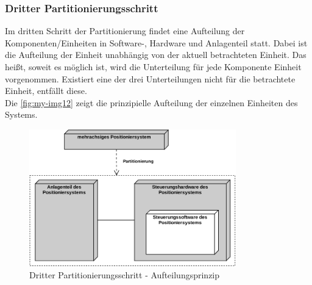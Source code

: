 \documentclass[../Bachelorarbeit.tex]{subfiles}
\begin{document}
\subsubsection{Dritter Partitionierungsschritt}
Im dritten Schritt der Partitionierung findet eine Aufteilung der Komponenten/Einheiten in Software-, Hardware und Anlagenteil statt. Dabei ist die Aufteilung der Einheit unabhängig von der aktuell betrachteten Einheit. Das heißt, soweit es möglich ist, wird die Unterteilung für jede Komponente \bzw Einheit vorgenommen. Existiert eine der drei Unterteilungen nicht für die betrachtete Einheit, entfällt diese.\\
Die \autoref{fig:my-img12} zeigt die prinzipielle Aufteilung der einzelnen Einheiten des Systems.

\begin{figure}[H]
    \centering
    \includegraphics[width=0.8\textwidth]{Images/dritter_schritt.pdf}
    \caption[Dritter Partitionierungsschritt]{Dritter Partitionierungsschritt - Aufteilungsprinzip}
    \label{fig:my-img12}
\end{figure}
\end{document}
